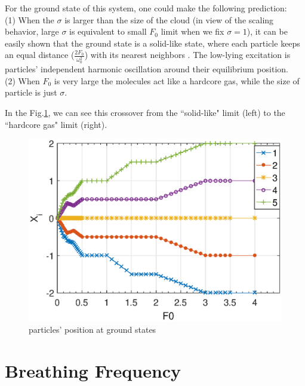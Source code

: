 \documentclass[aps,preprintnumbers,onecolumn,amsmath,amssymb,floatfix,pra]{revtex4-1}
\begin{document}
For the ground state of this system, one could make the following prediction: \\(1) When the
$\sigma$ is larger than the size of the cloud (in view of the scaling behavior, large $\sigma$ is
equivalent to small $F_0$ limit when we fix $\sigma=1$), it can be easily shown that the ground
state is a solid-like state, where each particle keeps an equal distance ($\frac{2F_0}{\omega_0^2}$)
with its nearest neighbors . The low-lying excitation is particles' independent harmonic oscillation
around their equilibrium position.\\(2) When $F_0$ is very large the molecules act like a hardcore
gas, while the size of particle is just $\sigma$.

In the Fig.\ref{fig:GS1}, we can see this crossover from the ``solid-like" limit (left) to the ``hardcore gas" limit (right).

\begin{figure}[h]
\centering
\includegraphics[scale=0.6]{ZhiyuPictures/N=5_GS_pre_2_rev.eps}
\caption{particles' position at ground states }
\label{fig:GS1}
\end{figure}



\section{Breathing Frequency}\label{section:breathing frequency}
\end{document}
